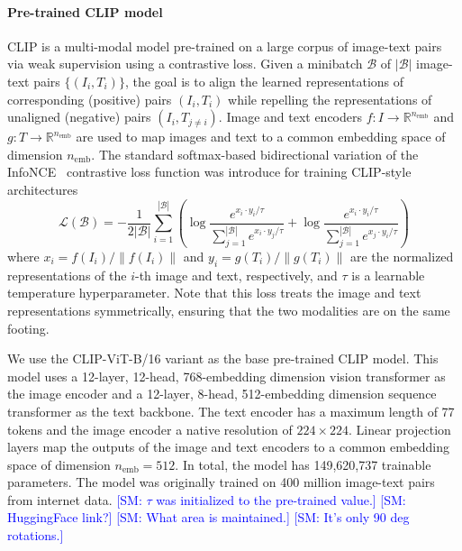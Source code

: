 \documentclass[10pt]{article} %
\newcommand{\SM}[1]{\textcolor{blue}{[SM: #1]}}
\begin{document}
\paragraph*{Pre-trained CLIP model}

CLIP \citep[Contrastive Language-Image Pretraining;][]{radford2021learning} is a multi-modal model pre-trained on a large corpus of image-text pairs via weak supervision using a contrastive loss.
%
Given a minibatch $\mathcal{B}$ of $|\mathcal{B}|$ image-text pairs $\{(I_i, T_i)\}$, the goal is to align the learned representations of corresponding (positive) pairs $(I_i, T_i)$ while repelling the representations of unaligned (negative) pairs $(I_i, T_{j\neq i})$.
%
Image and text encoders $f: I \rightarrow \mathbb R^{n_\text{emb}}$ and $g: T \rightarrow \mathbb R^{n_\text{emb}}$ are used to map images and text to a common embedding space of dimension $n_\text{emb}$.
%
The standard softmax-based bidirectional variation of the InfoNCE~\citep{oord2018representation} contrastive loss function was introduce for training CLIP-style architectures \citep{radford2021learning}
\begin{equation}
  \mathcal{L}(\mathcal{B})=-\frac{1}{2|\mathcal{B}|} \sum_{i=1}^{|\mathcal{B}|}\left(\log \frac{e^{x_i \cdot y_i / \tau}}{\sum_{j=1}^{|\mathcal{B}|} e^{x_i \cdot y_j / \tau}}+\log \frac{e^{x_i \cdot y_i / \tau}}{\sum_{j=1}^{|\mathcal{B}|} e^{x_j \cdot y_i / \tau}}\right)\label{eq:softmax_loss}
\end{equation}
where ${x}_i={f\left(I_i\right)}/{\left\|f\left(I_i\right)\right\|}$ and ${y}_i={g\left(T_i\right)}/{\left\|g\left(T_i\right)\right\|}$ are the normalized representations of the $i$-th image and text, respectively, and $\tau$ is a learnable temperature hyperparameter.
%
Note that this loss treats the image and text representations symmetrically, ensuring that the two modalities are on the same footing.

We use the CLIP-ViT-B/16 \citep{radford2021learning} variant as the base pre-trained CLIP model.
%
This model uses a 12-layer, 12-head, 768-embedding dimension vision transformer as the image encoder and a 12-layer, 8-head, 512-embedding dimension sequence transformer as the text backbone.
%
The text encoder has a maximum length of 77 tokens and the image encoder a native resolution of $224\times224$.
%
Linear projection layers map the outputs of the image and text encoders to a common embedding space of dimension $n_\text{emb}=512$.
%
In total, the model has 149,620,737 trainable parameters.
%
The model was originally trained on 400 million image-text pairs from internet data. \SM{$\tau$ was initialized to the pre-trained value.} \SM{HuggingFace link?} \SM{What area is maintained.} \SM{It's only 90 deg rotations.}
%
\end{document}
